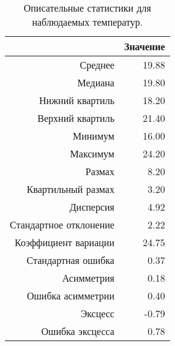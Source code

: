 \begin{table}[ht]
\centering
\begin{tabular}{rr}
  \hline
 & Значение \\ 
  \hline
Среднее & 19.88 \\ 
  Медиана & 19.80 \\ 
  Нижний квартиль & 18.20 \\ 
  Верхний квартиль & 21.40 \\ 
  Минимум & 16.00 \\ 
  Максимум & 24.20 \\ 
  Размах & 8.20 \\ 
  Квартильный размах & 3.20 \\ 
  Дисперсия & 4.92 \\ 
  Стандартное отклонение & 2.22 \\ 
  Коэффициент вариации & 24.75 \\ 
  Стандартная ошибка & 0.37 \\ 
  Асимметрия & 0.18 \\ 
  Ошибка асимметрии & 0.40 \\ 
  Эксцесс & -0.79 \\ 
  Ошибка эксцесса & 0.78 \\ 
   \hline
\end{tabular}
\caption{Описательные статистики для наблюдаемых температур.} 
\label{table:dstats}
\end{table}

